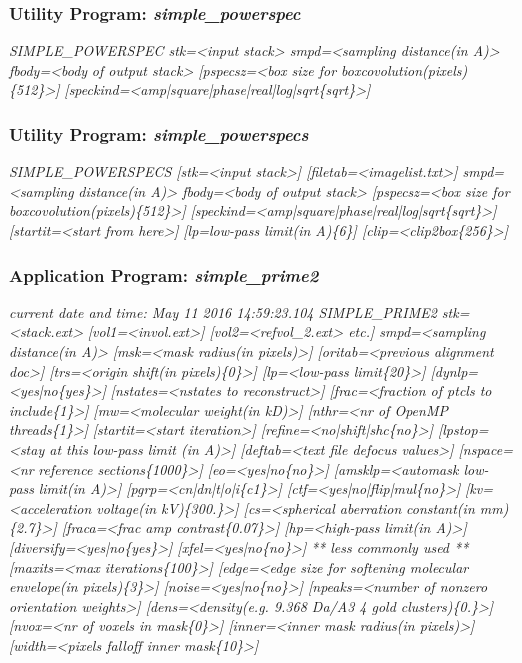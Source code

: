 \documentclass[review]{elsarticle}
\begin{document}
{{\subsubsection{Utility Program: {\it{simple\_powerspec}}}
\label{powerspec}
{\it{SIMPLE\_POWERSPEC stk=<input stack> smpd=<sampling distance(in A)> fbody=<body}}
{\it{of output stack> [pspecsz=<box size for boxcovolution(pixels)\{512\}>]}}
{\it{[speckind=<amp|square|phase|real|log|sqrt\{sqrt\}>]}}

\subsubsection{Utility Program: {\it{simple\_powerspecs}}}
\label{powerspecs}
{\it{SIMPLE\_POWERSPECS [stk=<input stack>] [filetab=<imagelist.txt>] smpd=<sampling}}
{\it{distance(in A)> fbody=<body of output stack> [pspecsz=<box size for}}
{\it{boxcovolution(pixels)\{512\}>]}}
{\it{[speckind=<amp|square|phase|real|log|sqrt\{sqrt\}>] [startit=<start from here>]}}
{\it{[lp=low-pass limit(in A)\{6\}] [clip=<clip2box\{256\}>]}}

\subsubsection{Application Program: {\it{simple\_prime2}}}
\label{prime2}
{\it{current date and time: May 11 2016 14:59:23.104 SIMPLE\_PRIME2 stk=<stack.ext>}}
{\it{[vol1=<invol.ext>] [vol2=<refvol\_2.ext> etc.] smpd=<sampling distance(in A)>}}
{\it{[msk=<mask radius(in pixels)>] [oritab=<previous alignment doc>] [trs=<origin}}
{\it{shift(in pixels)\{0\}>] [lp=<low-pass limit\{20\}>] [dynlp=<yes|no\{yes\}>]}}
{\it{[nstates=<nstates to reconstruct>] [frac=<fraction of ptcls to include\{1\}>]}}
{\it{[mw=<molecular weight(in kD)>] [nthr=<nr of OpenMP threads\{1\}>]}}
{\it{[startit=<start iteration>] [refine=<no|shift|shc\{no\}>] [lpstop=<stay at this}}
{\it{low-pass limit (in A)>] [deftab=<text file defocus values>] [nspace=<nr}}
{\it{reference sections\{1000\}>] [eo=<yes|no\{no\}>] [amsklp=<automask low-pass}}
{\it{limit(in A)>] [pgrp=<cn|dn|t|o|i\{c1\}>] [ctf=<yes|no|flip|mul\{no\}>]}}
{\it{[kv=<acceleration voltage(in kV)\{300.\}>] [cs=<spherical aberration}}
{\it{constant(in mm)\{2.7\}>] [fraca=<frac amp contrast\{0.07\}>] [hp=<high-pass}}
{\it{limit(in A)>] [diversify=<yes|no\{yes\}>] [xfel=<yes|no\{no\}>]}}
{\it{** less commonly used **}}
{\it{[maxits=<max iterations\{100\}>] [edge=<edge size for softening molecular}}
{\it{envelope(in pixels)\{3\}>] [noise=<yes|no\{no\}>] [npeaks=<number of nonzero}}
{\it{orientation weights>] [dens=<density(e.g. 9.368 Da/A3 4 gold clusters)\{0.\}>]}}
{\it{[nvox=<nr of voxels in mask\{0\}>] [inner=<inner mask radius(in pixels)>]}}
{\it{[width=<pixels falloff inner mask\{10\}>]}}

}}
\end{document}
